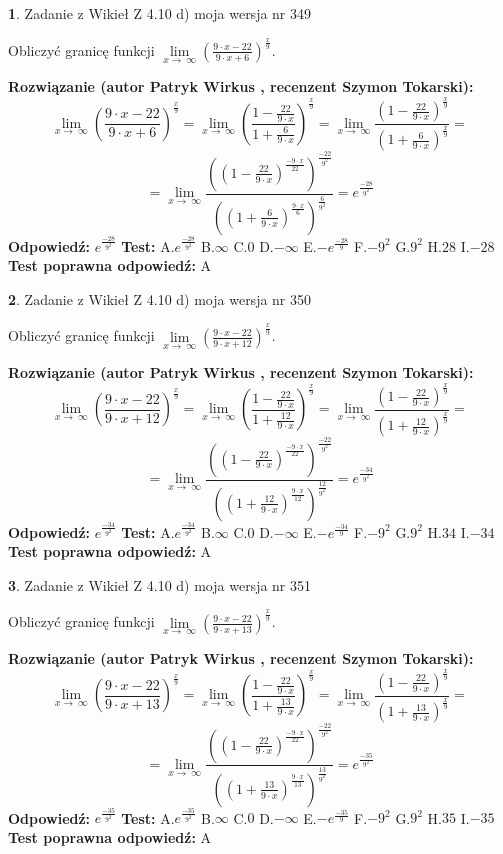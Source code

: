 \documentclass[12pt, a4paper]{article}
\theoremstyle{definition} %
\newtheorem{zad}{}
\newcommand{\zadStart}[1]{\begin{zad}#1\newline}
\newcommand{\zadStop}{\end{zad}}
\newcommand{\rozwStart}[2]{\noindent \textbf{Rozwiązanie (autor #1 , recenzent #2): }\newline}
\newcommand{\rozwStop}{\newline}
\newcommand{\odpStart}{\noindent \textbf{Odpowiedź:}\newline}
\newcommand{\odpStop}{\newline}
\newcommand{\testStart}{\noindent \textbf{Test:}\newline}
\newcommand{\testStop}{\newline}
\newcommand{\kluczStart}{\noindent \textbf{Test poprawna odpowiedź:}\newline}
\newcommand{\kluczStop}{\newline}
\begin{document}
\zadStart{Zadanie z Wikieł Z 4.10 d) moja wersja nr 349}


Obliczyć granicę funkcji  $\lim\limits_{x\to\ \infty}(\frac{9\cdot x-22}{9\cdot x+6})^{\frac{x}{9}}$.
\zadStop
\rozwStart{Patryk Wirkus}{Szymon Tokarski}
$$\lim\limits_{x\to\ \infty}(\frac{9\cdot x-22}{9\cdot x+6})^{\frac{x}{9}} = \lim\limits_{x\to\ \infty}(\frac{1-\frac{22}{9\cdot x}}{1+\frac{6}{9\cdot x}})^{\frac{x}{9}}=\lim\limits_{x\to\ \infty}\frac{(1-\frac{22}{9\cdot x})^{\frac{x}{9}}}{(1+\frac{6}{9\cdot x})^{\frac{x}{9}}}=$$
$$=\lim\limits_{x\to\ \infty}\frac{((1-\frac{22}{9\cdot x})^{\frac{-9\cdot x}{22}})^{\frac{-22}{9^{2}}}}{((1+\frac{6}{9\cdot x})^{\frac{9\cdot x}{6}})^{\frac{6}{9^{2}}}}=e^{\frac{-28}{9^{2}}}$$
\rozwStop
\odpStart
$e^{\frac{-28}{9^{2}}}$
\odpStop
\testStart
A.$e^{\frac{-28}{9^{2}}}$ B.$\infty$ C.$0$ D.$-\infty$ E.$-e^{\frac{-28}{9}}$
F.$-9^{2}$ G.$9^{2}$
H.$28$
I.$-28$
\testStop
\kluczStart
A
\kluczStop



\zadStart{Zadanie z Wikieł Z 4.10 d) moja wersja nr 350}


Obliczyć granicę funkcji  $\lim\limits_{x\to\ \infty}(\frac{9\cdot x-22}{9\cdot x+12})^{\frac{x}{9}}$.
\zadStop
\rozwStart{Patryk Wirkus}{Szymon Tokarski}
$$\lim\limits_{x\to\ \infty}(\frac{9\cdot x-22}{9\cdot x+12})^{\frac{x}{9}} = \lim\limits_{x\to\ \infty}(\frac{1-\frac{22}{9\cdot x}}{1+\frac{12}{9\cdot x}})^{\frac{x}{9}}=\lim\limits_{x\to\ \infty}\frac{(1-\frac{22}{9\cdot x})^{\frac{x}{9}}}{(1+\frac{12}{9\cdot x})^{\frac{x}{9}}}=$$
$$=\lim\limits_{x\to\ \infty}\frac{((1-\frac{22}{9\cdot x})^{\frac{-9\cdot x}{22}})^{\frac{-22}{9^{2}}}}{((1+\frac{12}{9\cdot x})^{\frac{9\cdot x}{12}})^{\frac{12}{9^{2}}}}=e^{\frac{-34}{9^{2}}}$$
\rozwStop
\odpStart
$e^{\frac{-34}{9^{2}}}$
\odpStop
\testStart
A.$e^{\frac{-34}{9^{2}}}$ B.$\infty$ C.$0$ D.$-\infty$ E.$-e^{\frac{-34}{9}}$
F.$-9^{2}$ G.$9^{2}$
H.$34$
I.$-34$
\testStop
\kluczStart
A
\kluczStop



\zadStart{Zadanie z Wikieł Z 4.10 d) moja wersja nr 351}


Obliczyć granicę funkcji  $\lim\limits_{x\to\ \infty}(\frac{9\cdot x-22}{9\cdot x+13})^{\frac{x}{9}}$.
\zadStop
\rozwStart{Patryk Wirkus}{Szymon Tokarski}
$$\lim\limits_{x\to\ \infty}(\frac{9\cdot x-22}{9\cdot x+13})^{\frac{x}{9}} = \lim\limits_{x\to\ \infty}(\frac{1-\frac{22}{9\cdot x}}{1+\frac{13}{9\cdot x}})^{\frac{x}{9}}=\lim\limits_{x\to\ \infty}\frac{(1-\frac{22}{9\cdot x})^{\frac{x}{9}}}{(1+\frac{13}{9\cdot x})^{\frac{x}{9}}}=$$
$$=\lim\limits_{x\to\ \infty}\frac{((1-\frac{22}{9\cdot x})^{\frac{-9\cdot x}{22}})^{\frac{-22}{9^{2}}}}{((1+\frac{13}{9\cdot x})^{\frac{9\cdot x}{13}})^{\frac{13}{9^{2}}}}=e^{\frac{-35}{9^{2}}}$$
\rozwStop
\odpStart
$e^{\frac{-35}{9^{2}}}$
\odpStop
\testStart
A.$e^{\frac{-35}{9^{2}}}$ B.$\infty$ C.$0$ D.$-\infty$ E.$-e^{\frac{-35}{9}}$
F.$-9^{2}$ G.$9^{2}$
H.$35$
I.$-35$
\testStop
\kluczStart
A
\kluczStop
\end{document}
